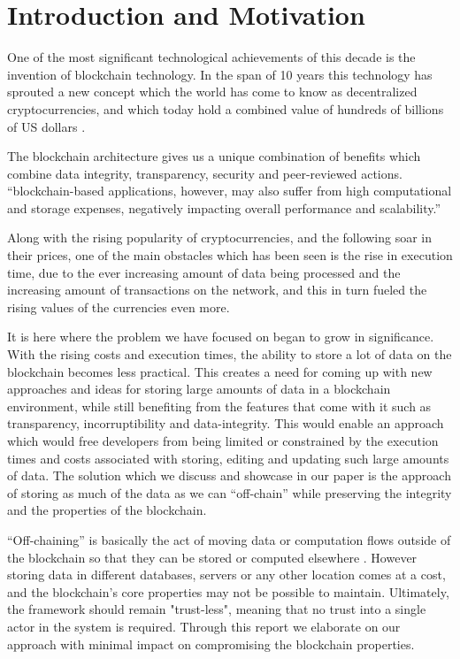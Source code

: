 \section{Introduction and Motivation}

One of the most significant technological achievements of this decade is the invention of blockchain technology. In the span of 10 years this technology has sprouted a new concept which the world has come to know as decentralized cryptocurrencies, and which today hold a combined value of hundreds of billions of US dollars \cite{relatedWork40}.

The blockchain architecture gives us a unique combination of benefits which combine data integrity, transparency, security and peer-reviewed actions. 
“blockchain-based applications, however, may also suffer from high computational and storage expenses, negatively impacting overall performance and scalability.” \cite{Eberhardt2017}

Along with the rising popularity of cryptocurrencies, and the following soar in their prices, one of the main obstacles which has been seen is the rise in execution time, due to the ever increasing amount of data being processed and the increasing amount of transactions on the network, and this in turn fueled the rising values of the currencies even more.

It is here where the problem we have focused on began to grow in significance. With the rising costs and execution times, the ability to store a lot of data on the blockchain becomes less practical. This creates a need for coming up with new approaches and ideas for storing large amounts of data in a blockchain environment, while still benefiting from the features that come with it such as transparency, incorruptibility and data-integrity. This would enable an approach which would free developers from being limited or constrained by the execution times and costs associated with storing, editing and updating such large amounts of data. The solution which we discuss and showcase in our paper is the approach of storing as much of the data as we can “off-chain” while preserving the integrity and the properties of the blockchain.

“Off-chaining” is basically the act of moving data or computation flows outside of the blockchain so that they can be stored or computed elsewhere \cite{Eberhardt2017}. However storing data in different databases, servers or any other location comes at a cost, and the blockchain’s core properties may not be possible to maintain. Ultimately, the framework should remain "trust-less", meaning that no trust into a single actor in the system is required. Through this report we elaborate on our approach with minimal impact on compromising the blockchain properties.

